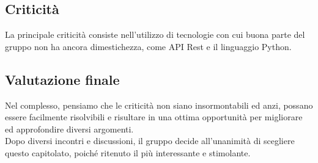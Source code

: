\subsection{Criticità}
La principale criticità consiste nell'utilizzo di tecnologie con cui buona parte del gruppo non ha ancora dimestichezza, come API Rest e il linguaggio Python.
\subsection{Valutazione finale}
Nel complesso, pensiamo che le criticità non siano insormontabili ed anzi, possano essere facilmente risolvibili e risultare in una ottima opportunità per migliorare ed approfondire diversi argomenti. 
\\Dopo diversi incontri e discussioni, il gruppo decide all'unanimità di scegliere questo capitolato, poiché ritenuto il più interessante e stimolante.